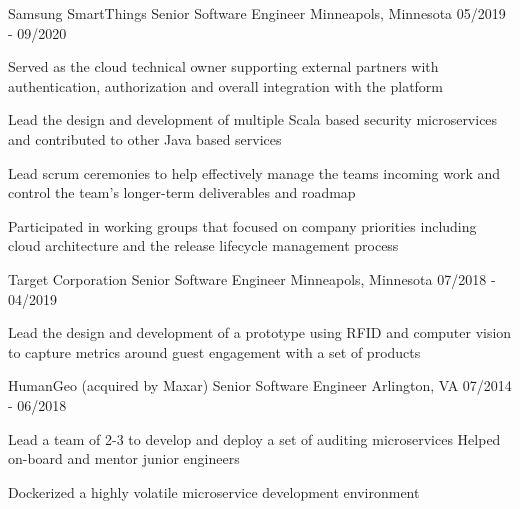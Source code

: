 \begin{cventries}
  \cventry
    {Samsung SmartThings} %
    {Senior Software Engineer} %
    {Minneapols, Minnesota} %
    {05/2019 - 09/2020} %
    {
      \begin{cvitems} %
        \item {Served as the cloud technical owner supporting external partners with authentication, authorization and overall integration with the platform}
        \item {Lead the design and development of multiple Scala based security microservices and contributed to other Java based services}
        \item {Lead scrum ceremonies to help effectively manage the teams incoming work and control the team's longer-term deliverables and roadmap}
        \item {Participated in working groups that focused on company priorities including cloud architecture and the release lifecycle management process}
      \end{cvitems}
    }

  \cventry
    {Target Corporation} %
    {Senior Software Engineer} %
    {Minneapols, Minnesota} %
    {07/2018 - 04/2019} %
    {
      \begin{cvitems} %
        \item {Lead the design and development of a prototype using RFID and computer vision to capture metrics around guest engagement with a set of products}
      \end{cvitems}
    }

  \cventry
    {HumanGeo (acquired by Maxar)} %
    {Senior Software Engineer} %
    {Arlington, VA} %
    {07/2014 - 06/2018} %
    {
      \begin{cvitems} %
        \item {Lead a team of 2-3 to develop and deploy a set of auditing microservices Helped on-board and mentor junior engineers}
        \item {Dockerized a highly volatile microservice development environment}
      \end{cvitems}
    }


\end{cventries}
